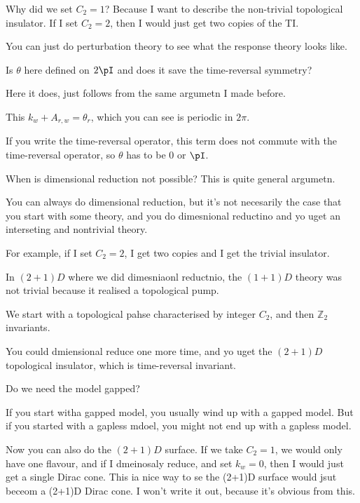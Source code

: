 Why did we set $C_2=1$?
Because I want to describe the non-trivial topological insulator.
If I set $C_2=2$, then I would just get two copies of the TI.

You can just do perturbation theory to see what the response theory looks like.

\begin{question}
    Is $\theta$ here defined on $2\pI$ and does it save the time-reversal
    symmetry?
\end{question}
Here it does, just follows from the same argumetn I made before.

This $k_w + A_{r,w}=\theta_r$,
which you can see is periodic in $2\pi$.

If you write the time-reversal operator,
this term does not commute with the time-reversal operator,
so $\theta$ has to be $0$ or $\pI$.

\begin{question}
    When is dimensional reduction not possible?
    This is quite general argumetn.
\end{question}
You can always do dimensional reduction,
but it's not necesarily the case that you start with some theory,
and you do dimesnional reductino and yo uget an interseting and nontrivial
theory.

For example, if I set $C_2=2$,
I get two copies and I get the trivial insulator.

In $(2+1)D$ where we did dimesniaonl reductnio,
the $(1+1)D$ theory was not trivial because it realised a topological pump.

We start with a topological pahse characterised by integer $C_2$,
and then $\mathbb{Z}_2$ invariants.

You could dmiensional reduce one more time,
and yo uget the $(2+1)D$ topological insulator,
which is time-reversal invariant.

\begin{question}
    Do we need the model gapped?
\end{question}
If you start witha gapped model,
you usually wind up with a gapped model.
But if you started with a gapless mdoel,
you might not end up with a gapless model.


Now you can also do the $(2+1)D$ surface.
If we take $C_2=1$,
we would only have one flavour,
and if I dmeinosaly reduce,
and set $k_w=0$,
then I would just get a single Dirac cone.
This ia nice way to se the (2+1)D surface
would jsut beceom a (2+1)D Dirac cone.
I won't write it out,
because it's obvious from this.


